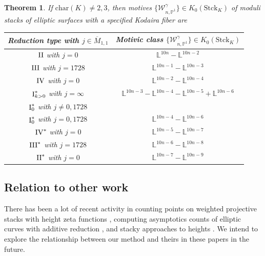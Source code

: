 \documentclass[a4paper,12pt]{amsart}
\newtheorem{thm}{Theorem}[section]
\theoremstyle{definition}
\newcommand{\bP}{\mathbb{P}}
\newcommand{\cW}{\mathcal{W}}
\newcommand{\I}{{\mathop{\rm I}}}
\newcommand{\II}{{\mathop{\rm II}}}
\newcommand{\III}{{\mathop{\rm III}}}
\newcommand{\IV}{{\mathop{\rm IV}}}
\newcommand{\Lb}{\mathbb{L}}
\begin{document}
	\begin{thm}\label{thm:motive_Rat}
		If $\mathrm{char}(K) \neq 2,3$, then motives $\{\cW_{n, \bP^1}^{\gamma}\} \in K_0(\mathrm{Stck}_{K})$ of moduli stacks of elliptic surfaces with a specified Kodaira fiber are
		\begin{table}[ht!]
			\label{TableOfMotive}
			\centering
			\begin{tabular}{|c|c|}
				\hline 
				Reduction type with  $j \in \overline{M}_{1,1}$ & Motivic class $\{\cW_{n, \bP^1}^{\gamma}\} \in K_0(\mathrm{Stck}_{K})$ \\ \hline
				$\II$ with $j=0$ & $ \Lb^{10n} - \Lb^{10n-2}$ \\ \hline
				$\III$ with $j=1728$ & $ \Lb^{10n-1} - \Lb^{10n-3}$ \\ \hline
				$\IV$ with $j=0$ & $ \Lb^{10n-2} - \Lb^{10n-4}$ \\ \hline
				$\I_{k > 0}^*$ with $j=\infty$ &  $ \Lb^{10n-3} - \Lb^{10n-4} - \Lb^{10n-5} + \Lb^{10n-6}$ \\
				$\I_0^*$ with $j\neq 0, 1728$ & $~$ \\ \hline
				$\I_0^*$ with $j=0, 1728$ & $ \Lb^{10n-4} - \Lb^{10n-6}$ \\ \hline
				$\IV^*$ with $j=0$ & $ \Lb^{10n-5} - \Lb^{10n-7}$ \\ \hline
				$\III^*$ with $j=1728$ & $ \Lb^{10n-6} - \Lb^{10n-8}$ \\ \hline
				$\II^*$ with $j=0$ & $ \Lb^{10n-7} - \Lb^{10n-9}$ \\ \hline
			\end{tabular}
		\end{table}
	\end{thm} 
	
	
	
	
	\subsection{Relation to other work} There has been a lot of recent activity in counting points on weighted projective stacks \cite{BGS, SST} with height zeta functions \cite{Darda, Tristan3}, computing asymptotics counts of elliptic curves with additive reduction \cite{CS, CJ, Tristan2, Tristan}, and stacky approaches to heights \cite{DY}. We intend to explore the relationship between our method and theirs in these papers in the future. 
	
\end{document}
